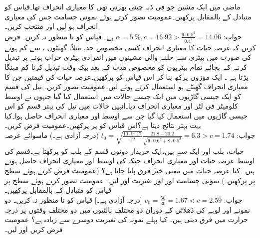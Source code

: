 \quad
ماضی میں ایک مشین جو فی ڈبہ  چینی بھرتی تھی کا معیاری انحراف  تھا۔قیاس  کو متبادل   کے بالمقابل پرکھیں۔عمومیت تصور کرتے ہوئے   نمونی جسامت   جس کی معیاری انحراف  ہو لیں اور 
 منتخب کریں۔\\
جواب:\quad
$\alpha=\SI{5}{\percent}, c=16.92>\tfrac{9\cdot 0.5^2}{0.4^2}=14.06$
 ہے۔ قیاس کو نا منظور نہ کریں۔
\quad
فرض کریں کہ  عرصہ حیات کا معیاری انحراف کسی مخصوص حد، مثلاً،  گھنٹوں ، سے کم ہونے کی صورت میں بیٹری سے چلنے والی مشینوں میں انفرادی بیٹری خراب ہونے پر تبدیل   کرنے کے بجائے  تمام بیٹریوں کو مخصوص مدت کے بعد بیک وقت تبدیل کرنا    کم مہنگا پڑتا ہے ۔ ایک موزوں پرکھ بنا کر اس قیاس کو پرکھیں۔عرصہ حیات کی  قیمتیں جن کا معیاری انحراف  گھنٹے ہو استعمال کرتے ہوئے  لیں۔عمومیت تصور کریں۔
\quad
تیل کی قسم  کو  ایک  جیسی  گاڑیوں میں ایک جیسے   حالات میں استعمال کیا گیا جنہوں نے اوسط  کلومیٹر فی لٹر اور معیاری انحراف  دیا۔انہیں حالات میں تیل کی بہتر قسم  کو اس جیسی  گاڑیوں میں استعمال کیا گیا جن سے اوسط  اور معیاری انحراف  حاصل ہوا۔کیا  بہت بہتر نتائج دیتا ہے؟اس قیاس کو  پر پرکھیں۔عمومیت فرض کریں۔\\
جواب:\quad
$t_0=\sqrt{\tfrac{10\cdot9\cdot17}{19}}\tfrac{21.8-20.2}{\sqrt{9\cdot 0.6^2+8\cdot0.5^2}}=6.3>c=1.74$
(درجہ آزادی  ہے۔)
\quad
ماسوائے عرصہ حیات، بلب  اور   ایک سے ہیں۔ایک خریدار دونوں قسم کے  بلب کو پرکھتا ہے۔قسم  کی  اوسط عرصہ حیات   اور معیاری انحراف  جبکہ  کی اوسط  اور معیاری انحراف  حاصل ہوتے ہیں۔ کیا عرصہ حیات میں معنی خیز فرق پایا جاتا ہے؟ (عمومیت فرض کرتے ہوئے  سطح پر پرکھیں۔)
\quad
نمونی جسامت  اور  اور تغیریت  اور  لیں۔ عمومیت تصور کرتے ہوئے  سطح پر  قیاس  کو متبادل  کے بالمقابل پرکھیں۔\\
جواب:\quad
$v_0=\tfrac{50}{30}=1.67<c=2.59$
[درجہ آزادی  ہے۔] قیاس کو نا منظور نہ کریں۔
\quad
دو نمونے  اور  لوہے کی ڈھلائی کے دوران دو مختلف بالٹیوں میں دو مختلف وقتوں پر درجہ حرارت  میں فرق دیتی ہیں۔ کیا پہلے نمونہ کی تغیریت دوسرے  سے زیادہ ہے؟ عمومیت فرض کریں اور  لیں۔

